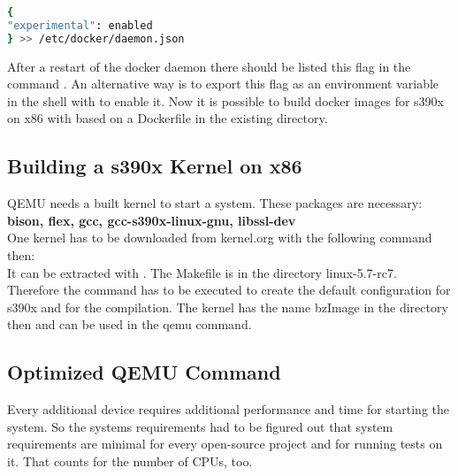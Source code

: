 \begin{lstlisting}[language=Bash,caption={This is an example of inline listing},captionpos=b]
{
"experimental": enabled
} >> /etc/docker/daemon.json
\end{lstlisting}

After a restart of the docker daemon there should be listed this flag in the command . An alternative way is to export this flag as an environment variable in the shell with  to enable it. Now it is possible to build docker images for s390x on x86 with  based on a Dockerfile in the existing directory.

 

 

\subsection{Building a s390x Kernel on x86}

QEMU needs a built kernel to start a system. These packages are necessary: \\
\textbf{bison, flex, gcc, gcc-s390x-linux-gnu, libssl-dev} \\
One kernel has to be downloaded from kernel.org with the following command then: \\
It can be extracted with . The Makefile is in the directory linux-5.7-rc7. Therefore the command  has to be executed to create the default configuration for s390x and  for the compilation. The kernel has the name bzImage in the directory  then and can be used in the qemu command.

\subsection{Optimized QEMU Command}

Every additional device requires additional performance and time for starting the system. So the systems requirements had to be figured out that system requirements are minimal for every open-source project and for running tests on it. That counts for the number of CPUs, too. \\

